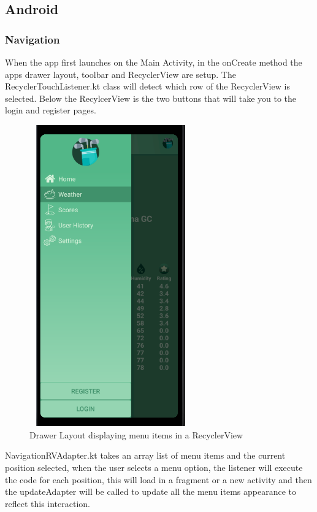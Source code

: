 \subsection{Android}
\subsubsection{Navigation}
When the app first launches on the Main Activity, in the onCreate method the apps drawer layout, toolbar and RecyclerView are setup. The RecyclerTouchListener.kt class will detect which row of the RecyclerView is selected. Below the RecylcerView is the two buttons that will take you to the login and register pages.
\begin{figure}[H]
    \centering
    \includegraphics[width=7cm, height = 13cm]{img/drawer_layout.PNG}
    \caption{Drawer Layout displaying menu items in a RecyclerView}
    \label{fig:Drawer Layout displaying menu items in a RecyclerView}
\end{figure}
NavigationRVAdapter.kt takes an array list of menu items and the current position selected, when the user selects a menu option, the listener will execute the code for each position, this will load in a fragment or a new activity and then the updateAdapter will be called to update all the menu items appearance to reflect this interaction.  

